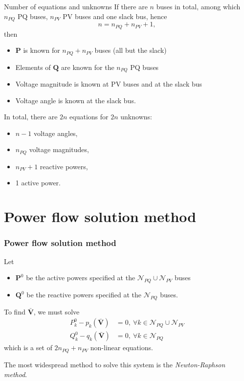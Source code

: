 \begin{frame}[allowframebreaks]{Number of equations and unknowns}
    If there are $n$ buses in total, among which $n_{PQ}$ PQ buses, $n_{PV}$ PV buses and one slack bus, hence
    $$ n = n_{PQ} + n_{PV} + 1,$$
    then
    \begin{itemize}
        \item $\mathbf{P}$ is known for $n_{PQ} + n_{PV}$ buses (all but the slack)
        \item Elements of $\mathbf{Q}$ are known for the $n_{PQ}$ PQ buses
        \item Voltage magnitude is known at PV buses and at the slack bus
        \item Voltage angle is known at the slack bus.
    \end{itemize}
    
    \vspace{1cm}
    
    In total, there are $2n$ equations for $2n$ unknowns:
    \begin{itemize}
        \item $n-1$ voltage angles, 
        \item $n_{PQ}$ voltage magnitudes, 
        \item $n_{PV} + 1$ reactive powers, 
        \item 1 active power.
    \end{itemize} 
\end{frame}

\section{Power flow solution method}

\begin{frame}
    \frametitle{Power flow solution method}
    Let
    \begin{itemize}
        \item $\mathbf{P}^0$ be the active powers specified at the $\mathcal{N}_{PQ} \cup \mathcal{N}_{PV}$ buses
        \item $\mathbf{Q}^0$ be the reactive powers specified at the $\mathcal{N}_{PQ}$ buses.
    \end{itemize}
    
    To find $\mathbf{\bar{V}}$, we must solve
    \begin{align*}
        P_k^0 - p_k(\mathbf{\bar{V}}) &= 0, \ \forall k \in \mathcal{N}_{PQ} \cup \mathcal{N}_{PV} \\
        Q_k^0 - q_k(\mathbf{\bar{V}}) &= 0, \ \forall k \in \mathcal{N}_{PQ}
    \end{align*}
    which is a set of $2 n_{PQ} + n_{PV}$ non-linear equations.
    
    The most widespread method to solve this system is the \textit{Newton-Raphson method}.
\end{frame}

